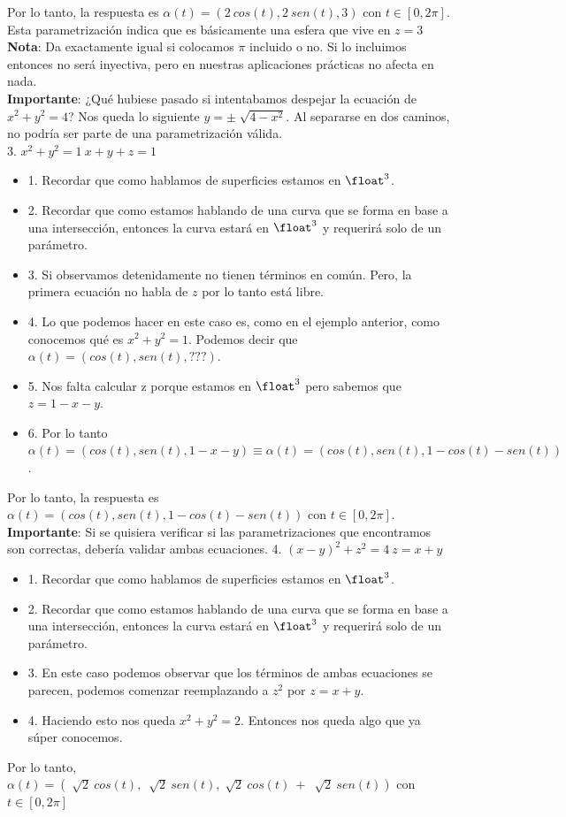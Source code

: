 \documentclass[10pt,a4paper]{article}
\begin{document}
Por lo tanto, la respuesta es $\alpha(t) = (2 \ cos(t), 2 \ sen(t), 3)$ con $t \in [0, 2\pi]$. \\
Esta parametrización indica que es básicamente una esfera que vive en $z=3$ \\
\textbf{Nota}: Da exactamente igual si colocamos $\pi$ incluido o no. Si lo incluimos entonces no será inyectiva, pero en nuestras aplicaciones prácticas no afecta en nada. \\
\textbf{Importante}: ¿Qué hubiese pasado si intentabamos despejar la ecuación de $x^{2} + y^{2} = 4$? Nos queda lo siguiente $ y = \pm \sqrt[]{4-x^{2}}$. Al separarse en dos caminos, no podría ser parte de una parametrización válida. \\
3. $x^{2} + y^{2} = 1 \ x + y + z = 1$
\begin{itemize}
    \item 1. Recordar que como hablamos de superficies estamos en $\float^{3}$.
    \item 2. Recordar que como estamos hablando de una curva que se forma en base a una intersección, entonces la curva estará en $\float^{3}$ y requerirá solo de un parámetro.
    \item 3. Si observamos detenidamente no tienen términos en común. Pero, la primera ecuación no habla de $z$ por lo tanto está libre. 
    \item 4. Lo que podemos hacer en este caso es, como en el ejemplo anterior, como conocemos qué es $x^{2} + y^{2} = 1$. Podemos decir que $\alpha(t) = (cos(t), sen(t), ???)$.
    \item 5. Nos falta calcular z porque estamos en $\float^{3}$ pero sabemos que $z = 1-x-y$. 
    \item 6. Por lo tanto $\alpha(t) = (cos(t), sen(t), 1-x-y) \equiv \alpha(t) = (cos(t), sen(t), 1-cos(t)-sen(t)) $.
\end{itemize}
Por lo tanto, la respuesta es $\alpha(t) = (cos(t), sen(t), 1-cos(t)-sen(t))$ con $t \in [0, 2\pi]$. \\
\textbf{Importante}: Si se quisiera verificar si las parametrizaciones que encontramos son correctas, debería validar ambas ecuaciones.
4. $(x-y)^{2} + z^{2} = 4 \ z = x+y$
\begin{itemize}
    \item 1. Recordar que como hablamos de superficies estamos en $\float^{3}$.
    \item 2. Recordar que como estamos hablando de una curva que se forma en base a una intersección, entonces la curva estará en $\float^{3}$ y requerirá solo de un parámetro.
    \item 3. En este caso podemos observar que los términos de ambas ecuaciones se parecen, podemos comenzar reemplazando a $z^{2}$ por $z=x+y$.
    \item 4. Haciendo esto nos queda $x^{2} + y^{2} = 2$. Entonces nos queda algo que ya súper conocemos. 
\end{itemize}
Por lo tanto, $\alpha(t) = (\sqrt[]{2} \ cos(t), \ \sqrt[]{2} \ sen(t), \sqrt[]{2} \ cos(t) \ + \ \sqrt[]{2} \ sen(t)) $ con $t \in [0, 2\pi]$
\end{document}

